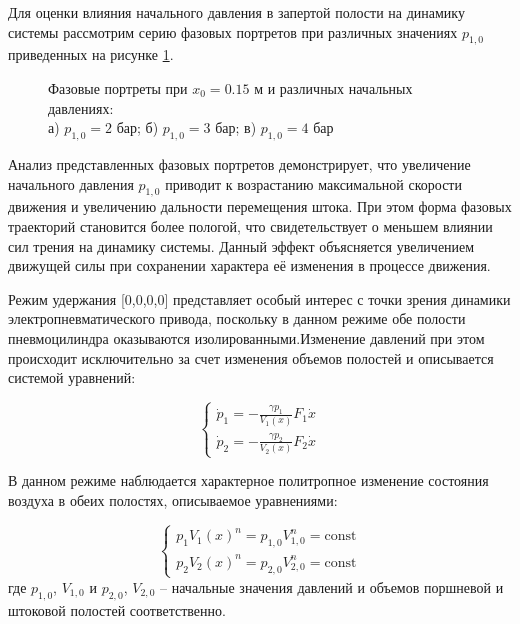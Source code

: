 Для оценки влияния начального давления в запертой полости на динамику системы рассмотрим
серию фазовых портретов при различных значениях $p_{1,0}$ приведенных на рисунке \ref{fig:pp_weak_pressure_matrix}.

\begin{figure}[htbp]
	\caption{Фазовые портреты при $x_0 = \num{0.15}$ м и различных начальных давлениях:\\
		а) $p_{1,0} = 2$ бар; б) $p_{1,0} = 3$ бар; в) $p_{1,0} = 4$ бар}
	\label{fig:pp_weak_pressure_matrix}
\end{figure}

Анализ представленных фазовых портретов демонстрирует, что увеличение начального давления $p_{1,0}$ приводит
к возрастанию максимальной скорости движения и увеличению дальности перемещения штока. При этом форма
фазовых траекторий становится более пологой, что свидетельствует о меньшем влиянии сил трения
на динамику системы. Данный эффект объясняется увеличением движущей силы при сохранении характера
её изменения в процессе движения.


Режим удержания [0,0,0,0] представляет особый интерес с точки зрения
динамики электропневматического привода, поскольку в данном режиме обе полости
пневмоцилиндра оказываются изолированными.Изменение давлений при этом
происходит исключительно за счет изменения объемов полостей и описывается системой уравнений:

$$\begin{cases}
		\dot{p}_1 = -\frac{\gamma p_1}{V_1(x)}F_1\dot{x} \\
		\dot{p}_2 = -\frac{\gamma p_2}{V_2(x)}F_2\dot{x}
	\end{cases}$$


В данном режиме наблюдается характерное
политропное изменение состояния воздуха в обеих полостях, описываемое уравнениями:

\begin{equation}
	\begin{cases}
		p_1V_1(x)^n = p_{1,0}V_{1,0}^n = \text{const} \\
		p_2V_2(x)^n = p_{2,0}V_{2,0}^n = \text{const}
	\end{cases}
\end{equation}
где $p_{1,0}$, $V_{1,0}$ и $p_{2,0}$, $V_{2,0}$ -- начальные значения давлений и объемов поршневой и штоковой полостей соответственно.

